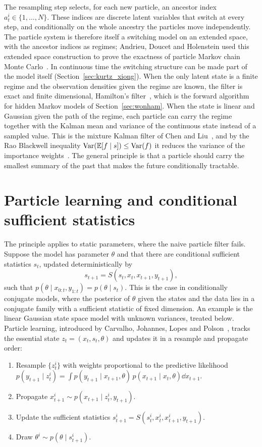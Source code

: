 The resampling step selects, for each new particle, an ancestor index $a^i_t\in\{1,\dots,N\}$. These indices are discrete latent variables that switch at every step, and conditionally on the whole ancestry the particles move independently. The particle system is therefore itself a switching model on an extended space, with the ancestor indices as regimes; Andrieu, Doucet and Holenstein used this extended space construction to prove the exactness of particle Markov chain Monte Carlo~\cite{adh2010}. In continuous time the switching structure can be made part of the model itself (Section~\ref{sec:kurtz_xiong}). When the only latent state is a finite regime and the observation densities given the regime are known, the filter is exact and finite dimensional, Hamilton's filter~\cite{hamilton1989}, which is the forward algorithm for hidden Markov models of Section~\ref{sec:wonham}. When the state is linear and Gaussian given the path of the regime, each particle can carry the regime together with the Kalman mean and variance of the continuous state instead of a sampled value. This is the mixture Kalman filter of Chen and Liu~\cite{chenliu2000}, and by the Rao Blackwell inequality $\mathrm{Var}(\mathbb{E}[f\mid s])\leq\mathrm{Var}(f)$ it reduces the variance of the importance weights~\cite{dga2000}. The general principle is that a particle should carry the smallest summary of the past that makes the future conditionally tractable.

\section{Particle learning and conditional sufficient statistics}
\label{sec:particle_learning}

The principle applies to static parameters, where the naive particle filter fails. Suppose the model has parameter $\theta$ and that there are conditional sufficient statistics $s_t$, updated deterministically by
\[
s_{t+1} = S(s_t,x_t,x_{t+1},y_{t+1}),
\]
such that $p(\theta\mid x_{0:t},y_{1:t}) = p(\theta\mid s_t)$. This is the case in conditionally conjugate models, where the posterior of $\theta$ given the states and the data lies in a conjugate family with a sufficient statistic of fixed dimension. An example is the linear Gaussian state space model with unknown variances, treated below. Particle learning, introduced by Carvalho, Johannes, Lopes and Polson~\cite{cjlp2010}, tracks the essential state $z_t = (x_t,s_t,\theta)$ and updates it in a resample and propagate order:
\begin{enumerate}
\item Resample $\{z^i_t\}$ with weights proportional to the predictive likelihood $p(y_{t+1}\mid z^i_t) = \int p(y_{t+1}\mid x_{t+1},\theta)\,p(x_{t+1}\mid x_t,\theta)\dd x_{t+1}$.
\item Propagate $x^i_{t+1}\sim p(x_{t+1}\mid z^i_t,y_{t+1})$.
\item Update the sufficient statistics $s^i_{t+1} = S(s^i_t,x^i_t,x^i_{t+1},y_{t+1})$.
\item Draw $\theta^i\sim p(\theta\mid s^i_{t+1})$.
\end{enumerate}

